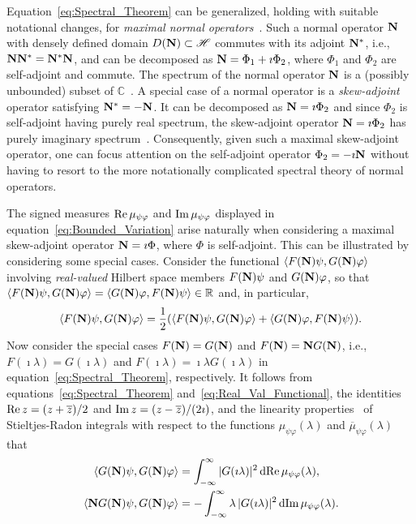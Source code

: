 \documentclass[amsa]{ipart}
\begin{document}
Equation~\eqref{eq:Spectral_Theorem} can be generalized, holding with
suitable notational changes, for \emph{maximal normal
  operators}~\cite{Stone:64}. Such a normal operator $\mathbf{N}$ with densely
defined domain $D(\mathbf{N})\subset\mathscr{H}$ commutes with its adjoint $\mathbf{N}^*$, i.e.,
$\mathbf{N}\mathbf{N}^*=\mathbf{N}^*\mathbf{N}$, and can be decomposed as $\mathbf{N}=\Phi_1+\imath\Phi_2$, where
$\Phi_1$ and $\Phi_2$ are self-adjoint and commute. The spectrum of the
normal operator $\mathbf{N}$ is 
a (possibly unbounded) subset of $\mathbb{C}$~\cite{Stone:64}. A
special case of a normal operator is a \emph{skew-adjoint} operator
satisfying $\mathbf{N}^*=-\mathbf{N}$. It can be decomposed as $\mathbf{N}=\imath\Phi_2$ and since
$\Phi_2$ is self-adjoint having purely real spectrum, the skew-adjoint
operator $\mathbf{N}=\imath\Phi_2$ has purely imaginary
spectrum~\cite{Stone:64}. Consequently, given such a maximal
skew-adjoint operator, one can focus attention on the self-adjoint
operator $\Phi_2=-\imath\mathbf{N}$ without having to resort to the more notationally
complicated spectral theory of normal operators.





The signed measures $\mbox{Re}\,\mu_{\psi\varphi}$ and $\mbox{Im}\,\mu_{\psi\varphi}$ displayed in
equation~\eqref{eq:Bounded_Variation} arise naturally when considering
a maximal skew-adjoint operator $\mathbf{N}=\imath\Phi$, where $\Phi$ is
self-adjoint. This can be illustrated by considering some special
cases. Consider the functional $\langle F(\mathbf{N})\psi,G(\mathbf{N})\varphi\rangle$ involving
\emph{real-valued} Hilbert space members $F(\mathbf{N})\psi$ and $G(\mathbf{N})\varphi$, so
that $\langle F(\mathbf{N})\psi,G(\mathbf{N})\varphi\rangle=\langle G(\mathbf{N})\varphi,F(\mathbf{N})\psi\rangle\in\mathbb{R}$ and, in
particular, 
%
\begin{align}\label{eq:Real_Val_Functional}
  \langle F(\Nb)\psi,G(\Nb)\varphi\rangle=\frac{1}{2}(\langle F(\Nb)\psi,G(\Nb)\varphi\rangle+\langle G(\Nb)\varphi,F(\Nb)\psi\rangle).
\end{align}
%
Now consider the special cases $F(\mathbf{N})=G(\mathbf{N})$ and $F(\mathbf{N})=\mathbf{N} G(\mathbf{N})$,
i.e., $F(\imath\lambda)=G(\imath\lambda)$ and $F(\imath\lambda)=\imath\lambda G(\imath\lambda)$ in
equation~\eqref{eq:Spectral_Theorem}, respectively. It follows 
from equations~\eqref{eq:Spectral_Theorem}
and~\eqref{eq:Real_Val_Functional}, the identities
$\mbox{Re}\, z=(z+\overline{z})/2$ and $\mbox{Im}\, z=(z-\overline{z})/(2\imath)$, and
the linearity properties~\cite{Stone:64} of Stieltjes-Radon integrals
with respect to the functions $\mu_{\psi\varphi}(\lambda)$ and $\overline{\mu}_{\psi\varphi}(\lambda)$ that
%
\begin{align}\label{eq:Real_Imag_mu_Reps}
  \langle G(\Nb)\psi,G(\Nb)\varphi\rangle&=\int_{-\infty}^\infty|G(\imath\lambda)|^2\,\d\Real\mu_{\psi\varphi}(\lambda),
  \\
   \langle\Nb G(\Nb)\psi,G(\Nb)\varphi\rangle&=-\int_{-\infty}^\infty\lambda\,|G(\imath\lambda)|^2\,\d\Imag\mu_{\psi\varphi}(\lambda).
   \notag
\end{align}
%
\end{document}
